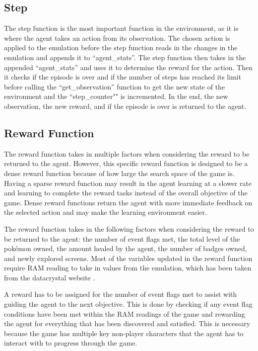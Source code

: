 \subsection{Step}

The step function is the most important function in the environment, as it is where the agent takes an action from its observation. The chosen action is applied to the emulation before the step function reads in the changes in the emulation and appends it to ``agent\_stats''. The step function then takes in the appended ``agent\_stats'' and uses it to determine the reward for the action. Then it checks if the episode is over and if the number of steps has reached its limit before calling the ``get\_observation'' function to get the new state of the environment and the ``step\_counter"" is incremented. In the end, the new observation, the new reward, and if the episode is over is returned to the agent.

\subsection{Reward Function}

The reward function takes in multiple factors when considering the reward to be returned to the agent. However, this specific reward function is designed to be a dense reward function because of how large the search space of the game is. Having a sparse reward function may result in the agent learning at a slower rate and learning to complete the reward tasks instead of the overall objective of the game. Dense reward functions return the agent with more immediate feedback on the selected action and may make the learning environment easier. 

The reward function takes in the following factors when considering the reward to be returned to the agent: the number of event flags met, the total level of the pokémon owned, the amount healed by the agent, the number of badges owned, and newly explored screens. Most of the variables updated in the reward function require RAM reading to take in values from the emulation, which has been taken from the datacrystal website \cite{datacrystal}.

A reward has to be assigned for the number of event flags met to assist with guiding the agent to the next objective. This is done by checking if any event flag conditions have been met within the RAM readings of the game and rewarding the agent for everything that has been discovered and satisfied. This is necessary because the game has multiple key non-player characters that the agent has to interact with to progress through the game. 

